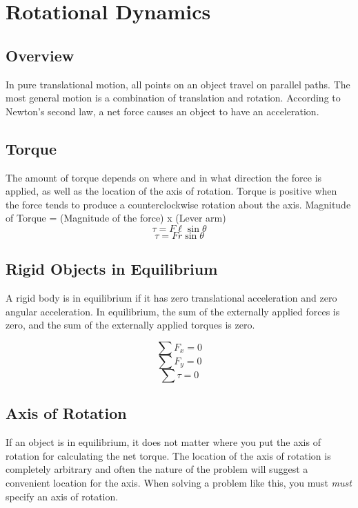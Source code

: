 \section{Rotational Dynamics}

\subsection{Overview}
In pure translational motion, all points on an object travel on parallel paths. The most general motion is a combination of translation and rotation. According to Newton’s second law, a net force causes an object to have an acceleration.

\subsection{Torque}
The amount of torque depends on where and in what direction the force is applied, as well as the location of the axis of rotation. Torque is positive when the force tends to produce a counterclockwise rotation about the axis. \newline \newline
\centering
Magnitude of Torque = (Magnitude of the force) x (Lever arm)	
\[\tau=F\ell\sin\theta\]
\[\tau=Fr\sin\theta\]
\raggedright 

\subsection{Rigid Objects in Equilibrium}
A rigid body is in equilibrium if it has zero translational acceleration and zero angular acceleration. In equilibrium,  the sum of the externally applied forces is zero, and the sum of the externally applied torques is zero.

\[\sum F_x=0\]
\[\sum F_y=0\]
\[\sum\tau=0\]

\subsection{Axis of Rotation}
If an object is in equilibrium, it does not matter where you put the axis of rotation for calculating the net torque. The location of the axis of rotation is completely arbitrary and often the nature of the problem will suggest a convenient location for the axis. When solving a problem like this, you must \emph{must} specify an axis of rotation.

